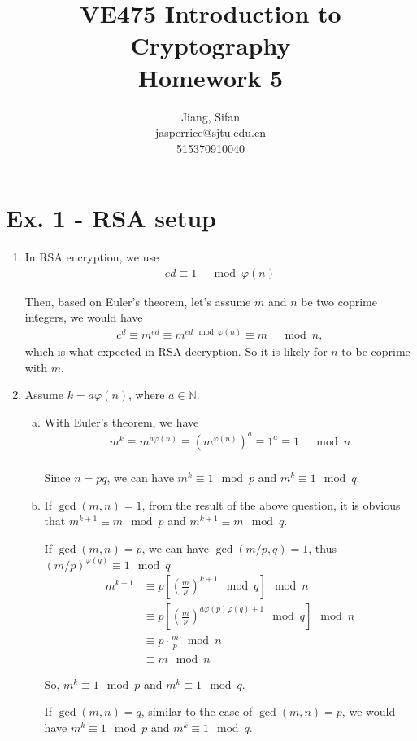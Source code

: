 \documentclass[11pt,a4paper]{article}
\title{
	VE475 Introduction to Cryptography \\
	Homework 5
}
\author{
	Jiang, Sifan\\
	jasperrice@sjtu.edu.cn\\
	515370910040
}
\begin{document}
\maketitle
\section*{Ex. 1 - RSA setup}
\begin{enumerate}
\item In RSA encryption, we use
\begin{align*}
	ed \equiv 1 &\mod \varphi(n)
\end{align*}
\par Then, based on Euler's theorem, let's assume $m$ and $n$ be two coprime integers, we would have
\begin{align*}
	c^{d} \equiv m^{ed} \equiv m^{ed \mod \varphi(n)} \equiv m &\mod n,
\end{align*}
which is what expected in RSA decryption. So it is likely for $n$ to be coprime with $m$.

\item Assume $k = a\varphi(n)$, where $a \in \mathbb{N}$. %
\begin{enumerate}[a)]
\item With Euler's theorem, we have
\begin{align*}
	m^{k} \equiv m^{a\varphi(n)} \equiv  (m^{\varphi(n)})^{a} \equiv 1^a \equiv 1 &\mod n \\
\end{align*}
\par Since $n = pq$, we can have $m^{k} \equiv 1 \mod p$ and $m^{k} \equiv 1 \mod q$.

\item If $\gcd(m,n) = 1$, from the result of the above question, it is obvious that $m^{k+1} \equiv m \mod p$ and $m^{k+1} \equiv m \mod q$.
\par If $\gcd(m,n) = p$, we can have $\gcd(m/p, q) = 1$, thus $(m/p)^{\varphi(q)} \equiv 1 \mod q$.
\begin{align*}
	m^{k+1} &\equiv  p \left[\left(\frac{m}{p}\right)^{k+1} \mod q\right] \mod n \\
	&\equiv p \left[\left(\frac{m}{p}\right)^{a\varphi(p)\varphi(q)+1} \mod q\right] \mod n \\
	&\equiv p \cdot \frac{m}{p} \mod n \\
	&\equiv m \mod n
\end{align*}
\par So, $m^{k} \equiv 1 \mod p$ and $m^{k} \equiv 1 \mod q$.
\par If $\gcd(m,n) = q$, similar to the case of $\gcd(m,n) = p$, we would have  $m^{k} \equiv 1 \mod p$ and $m^{k} \equiv 1 \mod q$.
\end{enumerate}


\end{enumerate}
\end{document}
